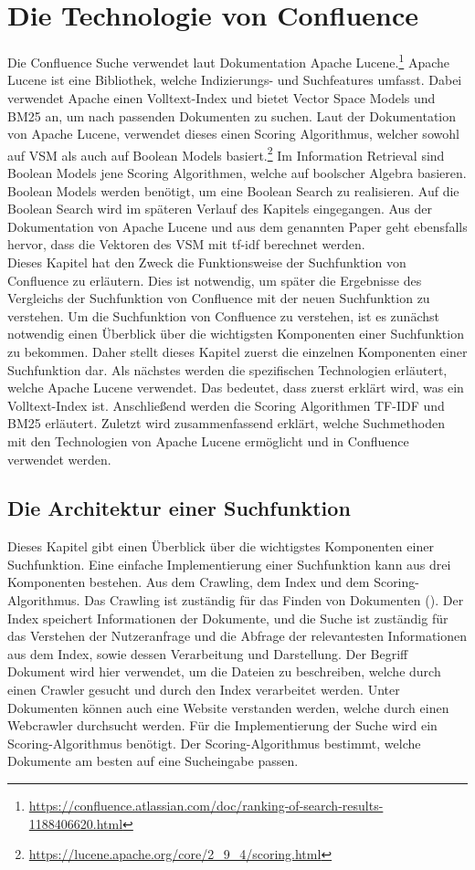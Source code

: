 \chapter{Die Technologie von Confluence}
Die Confluence Suche verwendet laut Dokumentation Apache Lucene.\footnote{\url{https://confluence.atlassian.com/doc/ranking-of-search-results-1188406620.html}}
Apache Lucene ist eine Bibliothek, welche Indizierungs- und Suchfeatures umfasst.
Dabei verwendet Apache einen Volltext-Index und bietet Vector Space Models und BM25 an, um nach passenden Dokumenten zu suchen.
Laut der Dokumentation von Apache Lucene, verwendet dieses einen Scoring Algorithmus, welcher sowohl auf VSM als auch auf Boolean Models basiert.\footnote{\url{https://lucene.apache.org/core/2_9_4/scoring.html}}
Im Information Retrieval sind Boolean Models jene Scoring Algorithmen, welche auf boolscher Algebra basieren.
Boolean Models werden benötigt, um eine Boolean Search zu realisieren.
Auf die Boolean Search wird im späteren Verlauf des Kapitels eingegangen.
Aus der Dokumentation von Apache Lucene und aus dem genannten Paper geht ebensfalls hervor, dass die Vektoren des VSM mit tf-idf berechnet werden.\\

Dieses Kapitel hat den Zweck die Funktionsweise der Suchfunktion von Confluence zu erläutern.
Dies ist notwendig, um später die Ergebnisse des Vergleichs der Suchfunktion von Confluence mit der neuen Suchfunktion zu verstehen.
Um die Suchfunktion von Confluence zu verstehen, ist es zunächst notwendig einen Überblick über die wichtigsten Komponenten einer Suchfunktion zu bekommen.
Daher stellt dieses Kapitel zuerst die einzelnen Komponenten einer Suchfunktion dar.
Als nächstes werden die spezifischen Technologien erläutert, welche Apache Lucene verwendet.
Das bedeutet, dass zuerst erklärt wird, was ein Volltext-Index ist.
Anschließend werden die Scoring Algorithmen TF-IDF und BM25 erläutert.
Zuletzt wird zusammenfassend erklärt, welche Suchmethoden mit den Technologien von Apache Lucene ermöglicht und in Confluence verwendet werden.

\section{Die Architektur einer Suchfunktion}
Dieses Kapitel gibt einen Überblick über die wichtigstes Komponenten einer Suchfunktion.
Eine einfache Implementierung einer Suchfunktion kann aus drei Komponenten bestehen.
Aus dem Crawling, dem Index und dem Scoring-Algorithmus.
Das Crawling ist zuständig für das Finden von Dokumenten (\cite{Castillo_2005}).
Der Index speichert Informationen der Dokumente, und die Suche ist zuständig für das Verstehen der Nutzeranfrage und die Abfrage der relevantesten Informationen aus dem Index, sowie dessen Verarbeitung und Darstellung.
Der Begriff Dokument wird hier verwendet, um die Dateien zu beschreiben, welche durch einen Crawler gesucht und durch den Index verarbeitet werden.
Unter Dokumenten können auch eine Website verstanden werden, welche durch einen Webcrawler durchsucht werden.
Für die Implementierung der Suche wird ein Scoring-Algorithmus benötigt.
Der Scoring-Algorithmus bestimmt, welche Dokumente am besten auf eine Sucheingabe passen.\\

